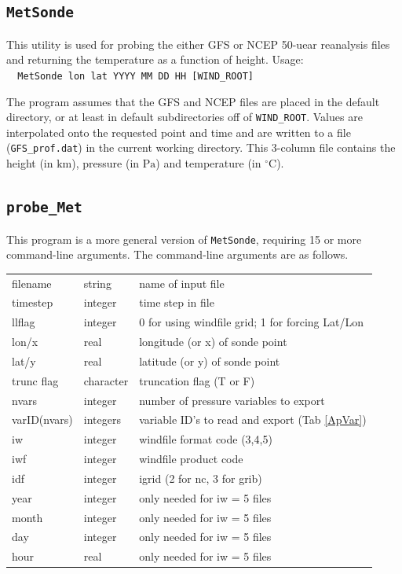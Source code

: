 \documentclass[11pt]{article}   %
\begin{document}
\subsection{\texttt{MetSonde}}
This utility is used for probing the either GFS or NCEP 50-uear reanalysis files and
returning the temperature as a function of height.  
Usage:\\
\verb|  MetSonde lon lat YYYY MM DD HH [WIND_ROOT]|

The program assumes that the GFS and NCEP files are placed in the default directory, or
at least in default subdirectories off of \texttt{WIND\_ROOT}.  Values are interpolated
onto the requested point and time and are written to a file (\texttt{GFS\_prof.dat}) in
the current working directory.  This 3-column file contains the height (in $\mathrm{km}$),
pressure (in $\mathrm{Pa}$) and temperature (in $^{\circ}\mathrm{C}$).

\subsection{\texttt{probe\_Met}}
This program is a more general version of \texttt{MetSonde}, requiring 15 or more command-line
arguments.  The command-line arguments are as follows.
\\
\begin{tabular}{ l  l  l }
filename      & string    & name of input file \\
timestep      & integer   & time step in file \\
llflag        & integer   & 0 for using windfile grid; 1 for forcing Lat/Lon \\
lon/x         & real      & longitude (or x) of sonde point \\
lat/y         & real      & latitude (or y) of sonde point \\
trunc flag    & character & truncation flag (T or F) \\
nvars         & integer   & number of pressure variables to export \\
varID(nvars)  & integers  & variable ID's to read and export (Tab \ref{ApVar}) \\
iw            & integer   & windfile format code (3,4,5) \\
iwf           & integer   & windfile product code \\
idf           & integer   & igrid (2 for nc, 3 for grib) \\
year          & integer   & only needed for iw = 5 files \\
month         & integer   & only needed for iw = 5 files \\
day           & integer   & only needed for iw = 5 files \\
hour          & real      & only needed for iw = 5 files \\
\end{tabular}
\end{document}
